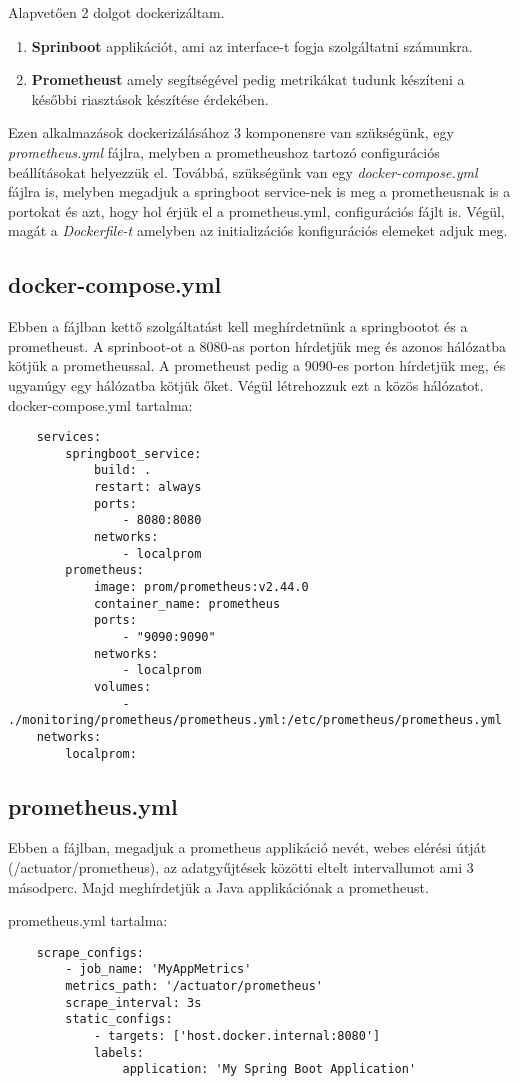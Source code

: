 Alapvetően 2 dolgot dockerizáltam.
\begin{enumerate}
	\item \textbf{Sprinboot} applikációt, ami az interface-t fogja szolgáltatni számunkra.
	\item \textbf{Prometheust} amely segítségével pedig metrikákat tudunk készíteni a későbbi riasztások készítése érdekében.
\end{enumerate}
Ezen alkalmazások dockerizálásához 3 komponensre van szükségünk, egy \textit{prometheus.yml} fájlra, melyben a prometheushoz tartozó configurációs beállításokat helyezzük el.
Továbbá, szükségünk van egy \textit{docker-compose.yml} fájlra is, melyben megadjuk a springboot service-nek is meg a prometheusnak is a portokat és azt, hogy hol érjük el a prometheus.yml, configurációs fájlt is.
Végül, magát a \textit{Dockerfile-t} amelyben az initializációs konfigurációs elemeket adjuk meg.
\subsection{docker-compose.yml}
Ebben a fájlban kettő szolgáltatást kell meghírdetnünk a springbootot és a prometheust.
A sprinboot-ot a 8080-as porton hírdetjük meg és azonos hálózatba kötjük a prometheussal.
A prometheust pedig a 9090-es porton hírdetjük meg, és ugyanúgy egy hálózatba kötjük őket.
Végül létrehozzuk ezt a közös hálózatot.
docker-compose.yml tartalma:
\begin{lstlisting}
	services:
		springboot_service:
			build: .
			restart: always
			ports:
				- 8080:8080
			networks:
				- localprom
		prometheus:
			image: prom/prometheus:v2.44.0
			container_name: prometheus
			ports:
				- "9090:9090"
			networks:
				- localprom
			volumes:
				- ./monitoring/prometheus/prometheus.yml:/etc/prometheus/prometheus.yml
	networks:
		localprom:
\end{lstlisting}
\subsection{prometheus.yml}
Ebben a fájlban, megadjuk a prometheus applikáció nevét, webes elérési útját (/actuator/prometheus), az adatgyűjtések közötti eltelt intervallumot ami 3 másodperc. Majd meghírdetjük a Java applikációnak a prometheust.

prometheus.yml tartalma:
\begin{lstlisting}
	scrape_configs:
		- job_name: 'MyAppMetrics'
		metrics_path: '/actuator/prometheus'
		scrape_interval: 3s
		static_configs:
			- targets: ['host.docker.internal:8080']
			labels:
				application: 'My Spring Boot Application'
\end{lstlisting}

